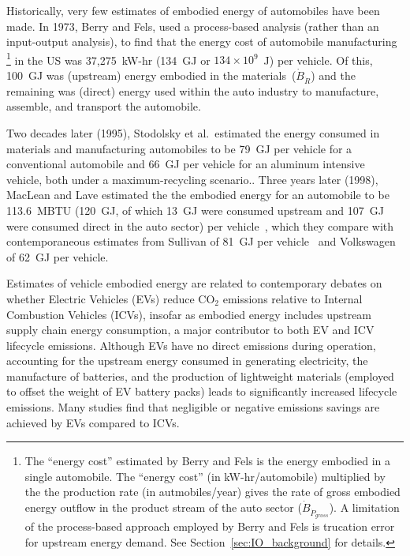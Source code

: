Historically, very few estimates of embodied energy of automobiles have been made.
In 1973, Berry and Fels, used a process-based analysis 
(rather than an input-output analysis),
to find that the energy cost of automobile 
manufacturing%
	\footnote{  %
	The ``energy cost'' estimated 
	by Berry and Fels is the 
	energy embodied in a single automobile. 
	The ``energy cost'' (in kW-hr/automobile) multiplied by the 
	the production rate (in autmobiles/year) gives the rate of gross embodied
	energy outflow in the product stream of the auto sector ($\dot{B}_{\dot{P}_{gross}}$).
	A limitation of the process-based approach employed by Berry and Fels
	is trucation error for upstream energy demand. 
	See Section~\ref{sec:IO_background} for details.
	}
in the US was 37,275~kW-hr (134~GJ or $134 \times 10^9$~J) 
per vehicle.\cite[Table~2]{Berry:1973vo} 
Of this,
100~GJ was (upstream) energy embodied in the materials~($\dot{B}_{\dot{R}}$)
and the remaining was (direct) energy used within the auto
industry to manufacture,
assemble, and transport the automobile. 

Two decades later (1995), Stodolsky et al.\ estimated the energy consumed in materials and 
manufacturing automobiles to be 79~GJ per vehicle for a conventional automobile and 66~GJ per vehicle
for an aluminum intensive vehicle, both under a maximum-recycling
scenario.\cite[p.11]{Stodolsky1995}. 
Three years later (1998), MacLean and Lave estimated the the embodied energy
for an automobile to be 113.6~MBTU 
(120~GJ, of which 13~GJ were consumed upstream and 107~GJ were consumed direct
in the auto sector)
per vehicle~\cite[Figure~2]{MacLean1998}, 
which they compare with
contemporaneous estimates from Sullivan of 81~GJ per 
vehicle~\cite{Sullivan1995} and Volkswagen of 62~GJ
per vehicle.\cite{Schweimer1996}

Estimates of vehicle embodied energy are related 
to contemporary debates on whether 
Electric Vehicles (EVs) reduce CO$_2$ emissions
relative to Internal Combustion Vehicles (ICVs),
insofar as embodied energy includes upstream supply chain energy consumption,
a major contributor to both EV and ICV lifecycle emissions.
Although EVs have no direct emissions during operation,
accounting for the upstream energy consumed in generating electricity, 
the manufacture of batteries, 
and the production of lightweight materials 
(employed to offset the weight of EV battery packs)
leads to significantly increased lifecycle emissions.
Many studies find that negligible or negative emissions
savings are achieved by EVs compared to
ICVs.\cite{Anair:2012aa, Hawkins2012,zehner2013unclean}


